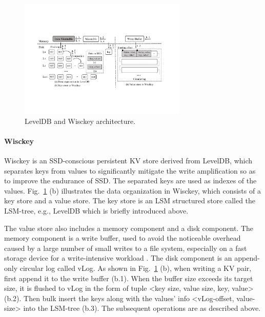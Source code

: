 \documentclass[sigconf]{acmart}
\begin{document}

\begin{figure}[!t]
	\setlength{\abovecaptionskip}{0.cm}	
	\setlength{\belowcaptionskip}{-0.cm}
	\centerline{\includegraphics[width=80mm]{lsm_wisckey.pdf}}
	\caption{LevelDB and Wisckey architecture.}
	\label{fig::lsm_wisckey}
\end{figure}

\paragraph{Wisckey} Wisckey is an SSD-conscious persistent KV store derived from LevelDB, which separates keys from values to significantly mitigate the write amplification so as to improve the endurance of SSD. The separated keys are used as indexes of the values. Fig.~\ref{fig::lsm_wisckey} (b) illustrates the data organization in Wisckey, which consists of a key store and a value store. The key store is an LSM structured store called the LSM-tree, e.g., LevelDB which is briefly introduced above.

The value store also includes a memory component and a disk component. The memory component is a write buffer, used to avoid the noticeable overhead caused by a large number of small writes to a file system, especially on a fast storage device for a write-intensive workload \cite{Arrakis, Wisckey}. The disk component is an append-only circular log called vLog. As shown in Fig.~\ref{fig::lsm_wisckey} (b), when writing a KV pair, first append it to the write buffer (b.1). When the buffer size exceeds its target size, it is flushed to vLog in the form of tuple \textless key size, value size, key, value\textgreater{} (b.2). Then bulk insert the keys along with the values’ info \textless vLog-offset, value-size\textgreater{} into the LSM-tree (b.3). The subsequent operations are as described above.
\end{document}
